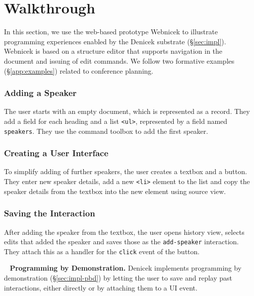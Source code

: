 \documentclass[sigconf,anonymous,screen]{acmart}
\newcommand*\circled[1]{\textnormal{\footnotesize\sffamily\bfseries\protect\tikz[baseline=(char.base)]{
  \node[shape=circle,fill=black,text=white,draw,inner sep=1pt] (char) {#1};}}}
\DeclareRobustCommand{\keyideabox}[3]{\begin{tcolorbox}[breakable,
  boxsep=5pt,left=0pt,right=0pt,top=0pt,bottom=0pt,width=\dimexpr\columnwidth\relax,
  colback=gray!20,colframe=gray!20,
  enlarge bottom by=0pt,enlarge top by=0pt,
  arc=0pt,outer arc=0pt]
\lettrine[lraise=0.3]{\LARGE #1}{~}
\small \textbf{#2.} #3
\end{tcolorbox}
}
\begin{document}
\newpage


\section{Walkthrough}
\label{sec:walk}

In this section, we use the web-based prototype Webnicek to illustrate programming
experiences enabled by the Denicek substrate (\S\ref{sec:impl}). Webnicek is based on a structure
editor that supports navigation in the document and issuing of edit commands. We follow two
formative examples (\S\ref{app:examples}) related to conference planning.

\subsubsection*{\circled{A} Adding a Speaker}
The user starts with an empty document, which is represented as a record. They add a field for
each heading and a list {\small\Verb_<ul>_}, represented by a field named {\small\Verb_speakers_}. They use the command
toolbox to add the first speaker.

\subsubsection*{\circled{B} Creating a User Interface} To simplify adding of
further speakers, the user creates a textbox and a button. They enter new speaker
details, add a new {\small\Verb_<li>_} element to the list and copy the speaker details
from the textbox into the new element using source view.

\subsubsection*{\circled{C} Saving the Interaction} After adding the speaker from the textbox,
the user opens history view, selects edits that added the speaker and saves those as the
{\small\Verb_add-speaker_} interaction. They attach this as a handler for the {\small\Verb_click_} event of the button.

\keyideabox{\faLightbulbO}{Programming by Demonstration}{Denicek implements programming by
demonstration (\S\ref{sec:impl-pbd}) by letting the user to save and replay past interactions,
either directly or by attaching them to a UI event.}
\end{document}
